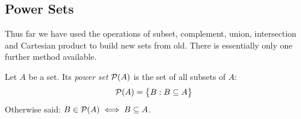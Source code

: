 \clearpage


\subsection{Power Sets}\label{sec:power}

Thus far we have used the operations of subset, complement, union, intersection and Cartesian product to build new sets from old. There is essentially only one further method available.

\begin{defn}{}{}
	Let $A$ be a set. Its \emph{power set} $\mathcal{P}(A)$ is the set of all subsets of $A$:
	\[
		\mathcal{P}(A)=\bigl\{B:B\subseteq A\bigr\}
	\]
	Otherwise said: $B\in\mathcal{P}(A)\iff B\subseteq A$.
\end{defn}


